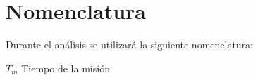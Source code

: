 \section{Nomenclatura}
Durante el análisis se utilizará la siguiente nomenclatura:

$T_m$ \tab Tiempo de la misión
